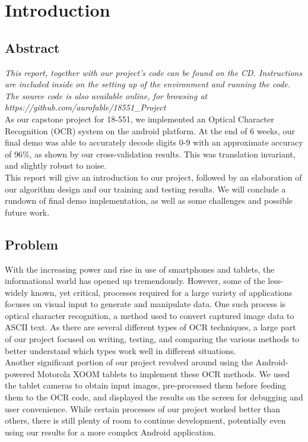 \section{Introduction}

\subsection{Abstract}
{\em
This report, together with our project's code can be found on the CD. Instructions
are included inside on the setting up of the environment and running the code.
The source code is also available online, for browsing at https://github.com/aurofable/18551\_Project
}\\

As our capstone project for 18-551, we implemented an Optical Character Recognition (OCR) system on the
android platform. At the end of 6 weeks, our final demo was able to accurately
decode digits 0-9 with an approximate accuracy of 96\%, as shown by our cross-validation
results. This was translation invariant, and slightly robust to noise.\\
This report will give an introduction to our project, followed by an elaboration of our 
algorithm design and our training and testing results. We will conclude a rundown of final demo
implementation, as well as some challenges and possible future work.\\

\subsection{Problem}
With the increasing power and rise in use of smartphones and tablets, 
the informational world has opened up tremendously. However, some of the less-widely known, 
yet critical, processes required for a large variety of applications focuses on visual 
input to generate and manipulate data. One such process is optical character recognition, 
a method used to convert captured image data to ASCII text. As there are several different 
types of OCR techniques, a large part of our project focused on writing, testing, and 
comparing the various methods to better understand which types work well in different 
situations.\\
Another significant portion of our project revolved around using the Android-powered 
Motorola XOOM tablets to implement these OCR methods. We used the tablet cameras to obtain 
input images, pre-processed them before feeding them to the OCR code, and displayed the 
results on the screen for debugging and user convenience. While certain processes of our 
project worked better than others, there is still plenty of room to continue development, 
potentially even using our results for a more complex Android application.


